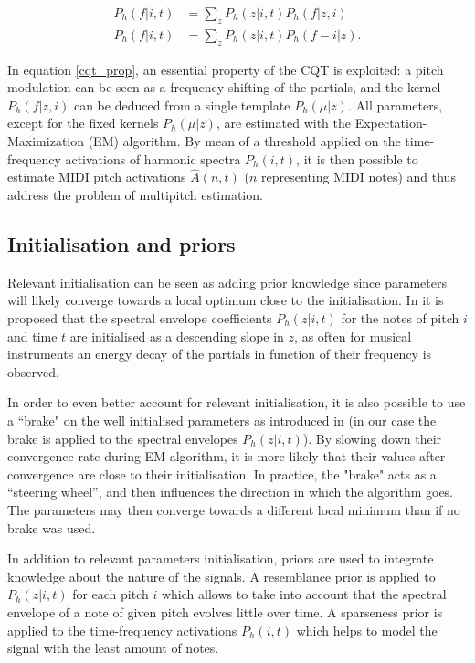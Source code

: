 \documentclass{article}
\begin{document}
\begin{align}
P_h(f|i,t) & = \sum_z P_h(z|i,t)P_h(f|z,i) \\
P_h(f|i,t) & = \sum_z P_h(z|i,t)P_h(f-i|z).
\label{cqt_prop}
\end{align}

In equation \ref{cqt_prop}, an essential property of the CQT is exploited: a pitch modulation can be seen as a frequency shifting of the partials, and the kernel $P_h(f|z,i)$ can be deduced from a single template $P_h(\mu|z)$.
All parameters, except for the fixed kernels $P_h(\mu|z)$, are estimated with the Expectation-Maximization (EM) algorithm. By mean of a threshold applied on the time-frequency activations of harmonic spectra $P_h(i,t)$, it is then possible to estimate MIDI pitch activations $\hat{A}(n,t)$ ($n$ representing MIDI notes) and thus address the problem of multipitch estimation.

\subsection{Initialisation and priors}
\label{sec:init-prior}

Relevant initialisation can be seen as adding prior knowledge since parameters will likely converge towards a local optimum close to the initialisation.
In \cite{Fuentes2013_PhD} it is proposed that the spectral envelope coefficients $P_h(z|i,t)$ for the notes of pitch $i$ and time $t$ are initialised as a descending slope in $z$, as often for musical instruments an energy decay of the partials in function of their frequency is observed.

In order to even better account for relevant initialisation, it is also possible to use a ``brake" on the well initialised parameters as introduced in \cite{Fuentes_EUSCIPCO2014} (in our case the brake is applied to the spectral envelopes $P_h(z|i,t)$). By slowing down their convergence rate during EM algorithm, it is more likely that their values after convergence are close to their initialisation. In practice, the "brake" acts as a “steering wheel”, and then influences the direction in which the algorithm goes. The parameters may then converge towards a different local minimum than if no brake was used.

In addition to relevant parameters initialisation, priors are used to integrate knowledge about the nature of the signals. A resemblance prior \cite{Fuentes2013_PhD} is applied to $P_h(z|i,t)$ for each pitch $i$ which allows to take into account that the spectral envelope of a note of given pitch evolves little over time. A sparseness prior is applied to the time-frequency activations $P_h(i,t)$ which helps to model the signal with the least amount of notes.
\end{document}
